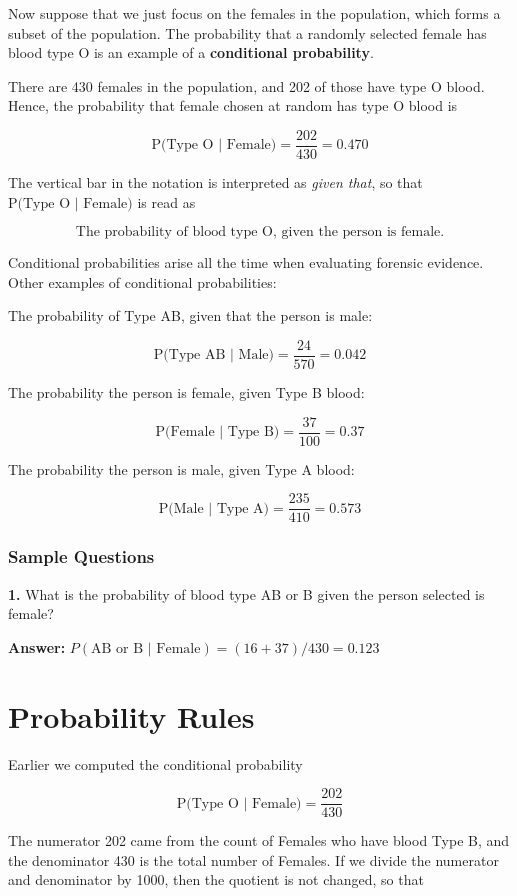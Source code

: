 \documentclass[
]{book}
\begin{document}
Now suppose that we just focus on the females in the population, which forms a subset of the population.
The probability that a randomly selected female has blood type O is an example of a \textbf{conditional probability}.

There are 430 females in the population, and 202 of those have type O blood.
Hence, the probability that female chosen at random has type O blood is

\[
\mbox{P(Type O | Female)} = \frac{202}{430} = 0.470
\]

The vertical bar in the notation is interpreted as \emph{given that}, so that \(\mbox{P(Type O | Female)}\) is read as

\[
\mbox{The probability of blood type O, given the person is female.}
\]

Conditional probabilities arise all the time when evaluating forensic evidence. Other examples of conditional probabilities:

The probability of Type AB, given that the person is male:

\[
\mbox{P(Type AB | Male)} = \frac{24}{570} = 0.042
\]

The probability the person is female, given Type B blood:

\[
\mbox{P(Female | Type B)} = \frac{37}{100} = 0.37
\]

The probability the person is male, given Type A blood:

\[
\mbox{P(Male | Type A)} = \frac{235}{410} = 0.573
\]

\hypertarget{sample-questions-4}{%
\subsection{Sample Questions}\label{sample-questions-4}}

\textbf{1.} What is the probability of blood type AB or B given the person selected is female?

\textbf{Answer:} \(P(\text{AB or B | Female}) = (16 + 37) / 430 = 0.123\)

\hypertarget{probability-rules}{%
\chapter{Probability Rules}\label{probability-rules}}

Earlier we computed the conditional probability

\[
\mbox{P(Type O | Female)} = \frac{202}{430} 
\]

The numerator 202 came from the count of Females who have blood Type B, and the denominator 430 is the total number of Females.
If we divide the numerator and denominator by 1000, then the quotient is not changed, so that
\end{document}
